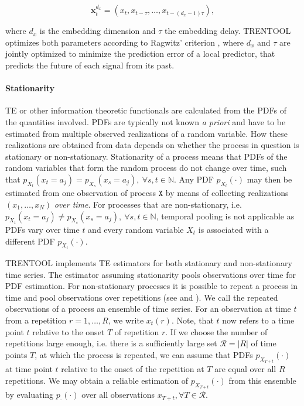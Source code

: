 \documentclass[a4paper,10pt]{article}
\begin{document}
\begin{equation}
  \mathbf{x}_t^{d_x}=\left( x_t,x_{t-\tau}, \ldots, x_{t-(d_x-1)\tau}\right),
\end{equation}

where $d_x$ is the embedding dimension and $\tau$ the embedding delay. TRENTOOL optimizes both parameters according to Ragwitz' criterion \cite{ragwitz2002}, where $d_x$ and $\tau$ are jointly optimized to minimize the prediction error of a local predictor, that predicts the future of each signal from its past.

\paragraph*{Stationarity} TE or other information theoretic functionals are calculated from the PDFs of the quantities involved. PDFs are typically not known \textit{a priori} and have to be estimated from multiple observed realizations of a random variable. How these realizations are obtained from data depends on whether the process in question is stationary or non-stationary. Stationarity of a process means that PDFs of the random variables that form the random process do not change over time, such that $p_{X_t}(x_t=a_j) = p_{X_{s}}(x_s=a_j),\  \forall s,t \in \mathbb{N}$. Any PDF $p_{X_t}(\cdot)$ may then be estimated from one observation of process $\mathtt{X}$ by means of collecting realizations $(x_1,\ldots, x_N)$ \emph{over time}. For processes that are non-stationary, i.e. $p_{X_t}(x_t=a_j) \neq p_{X_{s}}(x_s=a_j),\  \forall s,t \in \mathbb{N}$, temporal pooling is not applicable as PDFs vary over time $t$ and every random variable $X_t$ is associated with a different PDF $p_{X_t}(\cdot)$. 

TRENTOOL implements TE estimators for both stationary and non-stationary time series. The estimator assuming stationarity pools observations over time for PDF estimation. For non-stationary processes it is possible to repeat a process in time and pool observations over repetitions (see  and ). We call the repeated observations of a process an ensemble of time series. For an observation at time $t$ from a repetition $r = 1, \ldots, R$, we write $x_t(r)$. Note, that $t$ now refers to a time point $t$ relative to the onset $T$ of repetition $r$. If we choose the number of repetitions large enough, i.e. there is a sufficiently large set $\mathcal{R} = |R|$ of time points $T$, at which the process is repeated, we can assume that PDFs $p_{X_{T+t}}(\cdot)$ at time point $t$ relative to the onset of the repetition at $T$ are equal over all $R$ repetitions. We may obtain a reliable estimation of $p_{X_{T+t}}(\cdot)$ from this ensemble by evaluating $p_{\cdot}(\cdot)$ over 
all observations $x_{T+t},\forall T \in \mathcal{R}$. 
\end{document}
